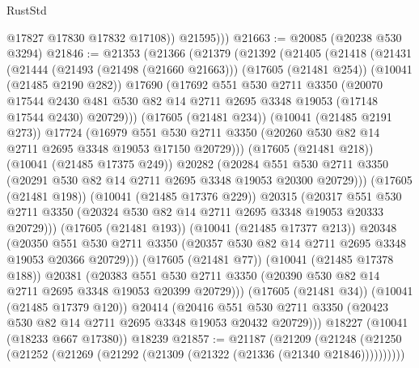 \begin{lexlean}{RustStd}
\begin{coremodule}
              @17827
              @17830
              @17832
              @17108))
          @21595)))
@21663 := @20085 (@20238 @530 @3294)
@21846 := @21353
    (@21366
      (@21379
        (@21392
          (@21405
            (@21418
              (@21431
                (@21444
                  (@21493 (@21498 (@21660 @21663)))
                  (@17605 (@21481 @254))
                  (@10041 (@21485 @2190 @282))
                  @17690
                  (@17692
                    @551
                    @530
                    @2711
                    @3350
                    (@20070
                      @17544
                      @2430
                      @481
                      @530
                      @82
                      @14
                      @2711
                      @2695
                      @3348
                      @19053
                      (@17148 @17544 @2430)
                      @20729)))
                (@17605 (@21481 @234))
                (@10041 (@21485 @2191 @273))
                @17724
                (@16979
                  @551
                  @530
                  @2711
                  @3350
                  (@20260 @530 @82 @14 @2711 @2695 @3348 @19053 @17150 @20729)))
              (@17605 (@21481 @218))
              (@10041 (@21485 @17375 @249))
              @20282
              (@20284
                @551
                @530
                @2711
                @3350
                (@20291 @530 @82 @14 @2711 @2695 @3348 @19053 @20300 @20729)))
            (@17605 (@21481 @198))
            (@10041 (@21485 @17376 @229))
            @20315
            (@20317
              @551
              @530
              @2711
              @3350
              (@20324 @530 @82 @14 @2711 @2695 @3348 @19053 @20333 @20729)))
          (@17605 (@21481 @193))
          (@10041 (@21485 @17377 @213))
          @20348
          (@20350
            @551
            @530
            @2711
            @3350
            (@20357 @530 @82 @14 @2711 @2695 @3348 @19053 @20366 @20729)))
        (@17605 (@21481 @77))
        (@10041 (@21485 @17378 @188))
        @20381
        (@20383 @551 @530 @2711 @3350 (@20390 @530 @82 @14 @2711 @2695 @3348 @19053 @20399 @20729)))
      (@17605 (@21481 @34))
      (@10041 (@21485 @17379 @120))
      @20414
      (@20416 @551 @530 @2711 @3350 (@20423 @530 @82 @14 @2711 @2695 @3348 @19053 @20432 @20729)))
    @18227
    (@10041 (@18233 @667 @17380))
    @18239
@21857 := @21187
    (@21209 (@21248 (@21250 (@21252 (@21269 (@21292 (@21309 (@21322 (@21336 (@21340 @21846))))))))))

\end{coremodule}
\end{lexlean}
